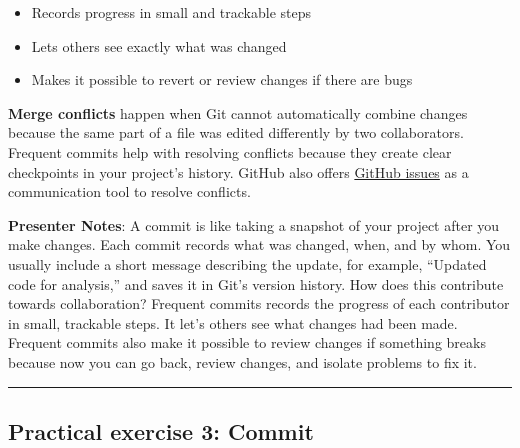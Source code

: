 \documentclass[
  letterpaper,
  DIV=11,
  numbers=noendperiod]{scrartcl}
\providecommand{\tightlist}{%
  \setlength{\itemsep}{0pt}\setlength{\parskip}{0pt}}
\begin{document}
\begin{itemize}
\tightlist
\item
  Records progress in small and trackable steps
\item
  Lets others see exactly what was changed
\item
  Makes it possible to revert or review changes if there are bugs
\end{itemize}

\begin{tcolorbox}[enhanced jigsaw, colbacktitle=quarto-callout-tip-color!10!white, opacityback=0, leftrule=.75mm, colback=white, opacitybacktitle=0.6, colframe=quarto-callout-tip-color-frame, title=\textcolor{quarto-callout-tip-color}{\faLightbulb}\hspace{0.5em}{Avoiding merge conflicts}, left=2mm, titlerule=0mm, toptitle=1mm, breakable, bottomtitle=1mm, arc=.35mm, rightrule=.15mm, bottomrule=.15mm, toprule=.15mm, coltitle=black]

\textbf{Merge conflicts} happen when Git cannot automatically combine
changes because the same part of a file was edited differently by two
collaborators. Frequent commits help with resolving conflicts because
they create clear checkpoints in your project's history. GitHub also
offers
\href{https://docs.github.com/en/issues/tracking-your-work-with-issues/learning-about-issues/about-issues}{GitHub
issues} as a communication tool to resolve conflicts.

\end{tcolorbox}

\textbf{Presenter Notes}: A commit is like taking a snapshot of your
project after you make changes. Each commit records what was changed,
when, and by whom. You usually include a short message describing the
update, for example, ``Updated code for analysis,'' and saves it in
Git's version history. How does this contribute towards collaboration?
Frequent commits records the progress of each contributor in small,
trackable steps. It let's others see what changes had been made.
Frequent commits also make it possible to review changes if something
breaks because now you can go back, review changes, and isolate problems
to fix it.

\begin{center}\rule{0.5\linewidth}{0.5pt}\end{center}

\subsection{Practical exercise 3:
Commit}\label{practical-exercise-3-commit}
\end{document}

